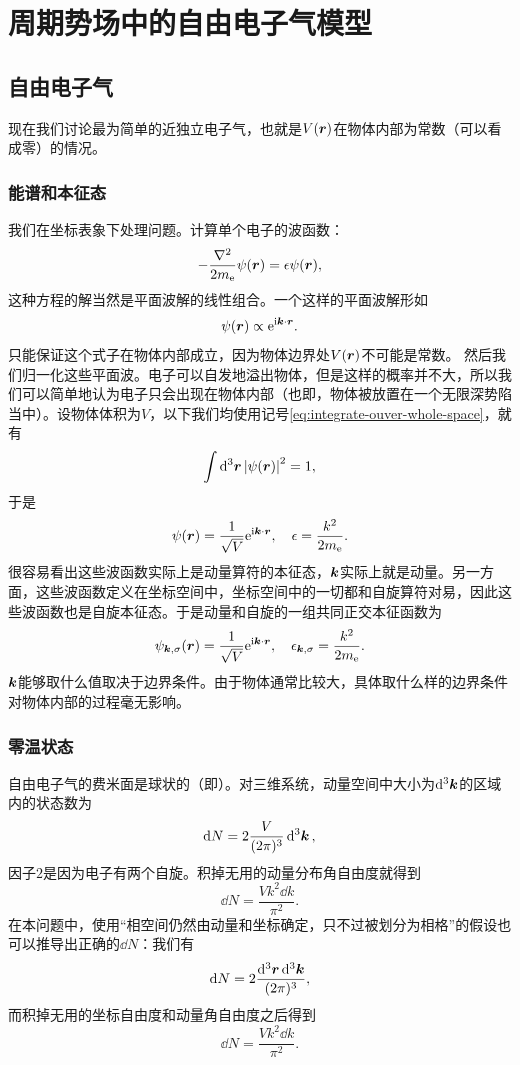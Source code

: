 \section{周期势场中的自由电子气模型}

\subsection{自由电子气}

现在我们讨论最为简单的近独立电子气，也就是$V(\vb*{r})$在物体内部为常数（可以看成零）的情况。

\subsubsection{能谱和本征态} 

我们在坐标表象下处理问题。计算单个电子的波函数：
\[
    - \frac{\laplacian}{2m_\text{e}} \psi(\vb*{r}) = \epsilon \psi(\vb*{r}),
\]
这种方程的解当然是平面波解的线性组合。一个这样的平面波解形如
\[
    \psi(\vb*{r}) \propto \mathrm{e}^{\mathrm{i} \vb*{k} \cdot \vb*{r}}.
\]
只能保证这个式子在物体内部成立，因为物体边界处$V(\vb*{r})$不可能是常数。
然后我们归一化这些平面波。电子可以自发地溢出物体，但是这样的概率并不大，所以我们可以简单地认为电子只会出现在物体内部（也即，物体被放置在一个无限深势陷当中）。设物体体积为$V$，以下我们均使用记号\eqref{eq:integrate-ouver-whole-space}，就有
\[
    \int \dd[3]{\vb*{r}} \abs{\psi(\vb*{r})}^2 = 1,
\]
于是
\[
    \psi (\vb*{r}) = \frac{1}{\sqrt{V}} \mathrm{e}^{\mathrm{i} \vb*{k} \cdot \vb*{r}}, \quad \epsilon = \frac{k^2}{2m_\text{e}}.
\]
很容易看出这些波函数实际上是动量算符的本征态，$\vb*{k}$实际上就是动量。另一方面，这些波函数定义在坐标空间中，坐标空间中的一切都和自旋算符对易，因此这些波函数也是自旋本征态。于是动量和自旋的一组共同正交本征函数为
\begin{equation}
    \psi_{\vb*{k},\sigma} (\vb*{r}) = \frac{1}{\sqrt{V}} \mathrm{e}^{\mathrm{i} \vb*{k} \cdot \vb*{r}}, \quad \epsilon_{\vb*{k},\sigma} = \frac{k^2}{2m_\text{e}}.
\end{equation}
$\vb*{k}$能够取什么值取决于边界条件。由于物体通常比较大，具体取什么样的边界条件对物体内部的过程毫无影响。

\subsubsection{零温状态} 

自由电子气的费米面是球状的（即）。对三维系统，动量空间中大小为$\dd[3]{\vb*{k}}$的区域内的状态数为
\begin{equation}
    \dd{N} = 2 \frac{V}{(2\pi)^3} \dd[3]{\vb*{k}},
\end{equation}
因子$2$是因为电子有两个自旋。积掉无用的动量分布角自由度就得到
\begin{equation}
    \dd{N} = \frac{V k^2 \dd{k}}{\pi^2}.
\end{equation}
在本问题中，使用“相空间仍然由动量和坐标确定，只不过被划分为相格”的假设也可以推导出正确的$\dd{N}$：我们有
\[
    \dd{N} = 2 \frac{\dd[3]{\vb*{r}} \dd[3]{\vb*{k}}}{(2\pi)^3},
\]
而积掉无用的坐标自由度和动量角自由度之后得到
\[
    \dd{N} = \frac{V k^2 \dd{k}}{\pi^2}.
\]

